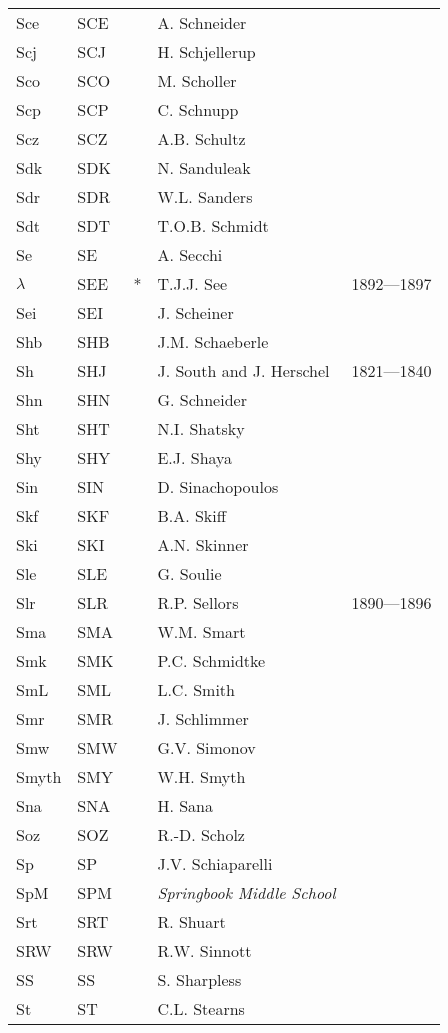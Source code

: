 \begin{longtable}{l|l|c|p{59mm}|l}
Sce & SCE &   & A. Schneider & \\
Scj & SCJ &   & H. Schjellerup & \\
Sco & SCO &   & M. Scholler & \\
Scp & SCP &   & C. Schnupp & \\
Scz & SCZ &   & A.B. Schultz & \\
Sdk & SDK &   & N. Sanduleak & \\
Sdr & SDR &   & W.L. Sanders & \\
Sdt & SDT &   & T.O.B. Schmidt & \\
Se  & SE  &   & A. Secchi & \\
$\lambda$ & SEE & *  & T.J.J. See & 1892---1897 \\
Sei & SEI &   & J. Scheiner & \\
Shb & SHB &   & J.M. Schaeberle & \\
Sh  & SHJ &   & J. South and J. Herschel & 1821---1840 \\
Shn & SHN &   & G. Schneider & \\
Sht & SHT &   & N.I. Shatsky & \\
Shy & SHY &   & E.J. Shaya & \\
Sin & SIN &   & D. Sinachopoulos & \\
Skf & SKF &   & B.A. Skiff & \\
Ski & SKI &   & A.N. Skinner & \\
Sle & SLE &   & G. Soulie & \\
Slr & SLR &   & R.P. Sellors & 1890---1896 \\
Sma & SMA &   & W.M. Smart & \\
Smk & SMK &   & P.C. Schmidtke & \\
SmL & SML &   & L.C. Smith & \\
Smr & SMR &   & J. Schlimmer & \\
Smw & SMW &   & G.V. Simonov & \\
Smyth & SMY &   & W.H. Smyth & \\
Sna & SNA &   & H. Sana & \\
Soz & SOZ &   & R.-D. Scholz & \\
Sp  & SP  &   & J.V. Schiaparelli & \\
SpM & SPM &   & \emph{Springbook Middle School} & \\
Srt & SRT &   & R. Shuart & \\
SRW & SRW &   & R.W. Sinnott & \\
SS  & SS  &   & S. Sharpless & \\
St  & ST  &   & C.L. Stearns & \\

\end{longtable}
